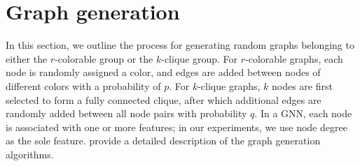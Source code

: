

\section{Graph generation}


In this section, we outline the process for generating random graphs belonging to either the $r$-colorable group or the $k$-clique group. For $r$-colorable graphs, each node is randomly assigned a color, and edges are added between nodes of different colors with a probability of $p$. For $k$-clique graphs, $k$ nodes are first selected to form a fully connected clique, after which additional edges are randomly added between all node pairs with probability $q$. In a GNN, each node is associated with one or more features; in our experiments, we use node degree as the sole feature.  provide a detailed description of the graph generation algorithms.



